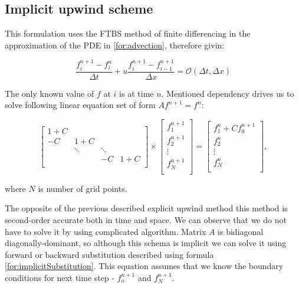 		\subsection{Implicit upwind scheme}
			This formulation uses the FTBS method of finite differencing in the approximation of the PDE in \ref{for:advection}, therefore givin:
			
			\begin{equation}
				\label{for:implicitUpwind_first}
				\frac{f_i^{n+1} - f_i^n}{\Delta t} + u\frac{f_i^{n+1} - f_{i-1}^{n+1}}{\Delta x} = \mathcal{O}(\Delta t, \Delta x)
			\end{equation}
	
			The only known value of $f$ at $i$ is at time $n$. Mentioned dependency drives us to solve following linear equation set of form $Af^{n+1} = f^n$:
			
			\begin{equation}
				\begin{bmatrix}
					1+C & & & \\
					-C & 1+C & & \\ 
					& \ddots & \ddots \\
					& & -C & 1+C \\					
				\end{bmatrix} 
				\times
				\begin{bmatrix}
					f_1^{n+1} \\
					f_2^{n+1} \\
					\vdots	\\
					f_N^{n+1}\\
				\end{bmatrix}
				=
				\begin{bmatrix}
					f_1^{n} + C f_0^{n+1}\\
					f_2^{n} \\
					\vdots	\\
					f_N^{n}\\
				\end{bmatrix},
			\end{equation} 
			
			where $N$ is number of grid points.
			
			The opposite of the previous described explicit upwind method this method is second-order accurate both in time and space. We can observe that we do not have to solve it by using complicated algorithm. Matrix $A$ is bidiagonal diagonally-dominant, so although this schema is implicit we can solve it using forward or backward substitution described using formula \ref{for:implicitSubstitution}. This equation assumes that we know the boundary conditions for next time step - $f_o^{n+1}$ and $f_N^{n+1}$.
			
